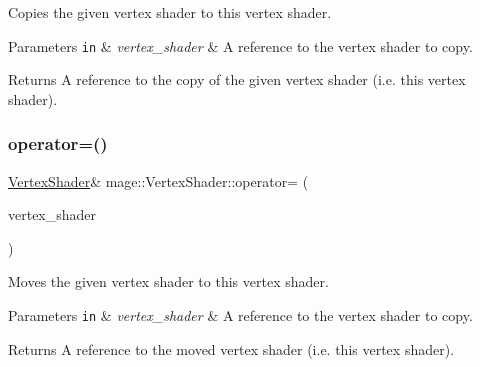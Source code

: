 Copies the given vertex shader to this vertex shader.


\begin{DoxyParams}[1]{Parameters}
\mbox{\tt in}  & {\em vertex\+\_\+shader} & A reference to the vertex shader to copy. \\
\hline
\end{DoxyParams}
\begin{DoxyReturn}{Returns}
A reference to the copy of the given vertex shader (i.\+e. this vertex shader). 
\end{DoxyReturn}
\hypertarget{classmage_1_1_vertex_shader_ada6250a89610e5649e0062c9a50fb78a}{}\label{classmage_1_1_vertex_shader_ada6250a89610e5649e0062c9a50fb78a} 
\subsubsection{\texorpdfstring{operator=()}{operator=()}\hspace{0.1cm}{\footnotesize\ttfamily [2/2]}}
{\footnotesize\ttfamily \hyperlink{classmage_1_1_vertex_shader}{Vertex\+Shader}\& mage\+::\+Vertex\+Shader\+::operator= (\begin{DoxyParamCaption}\item[{\hyperlink{classmage_1_1_vertex_shader}{Vertex\+Shader} \&\&}]{vertex\+\_\+shader }\end{DoxyParamCaption})\hspace{0.3cm}{\ttfamily [delete]}}

Moves the given vertex shader to this vertex shader.


\begin{DoxyParams}[1]{Parameters}
\mbox{\tt in}  & {\em vertex\+\_\+shader} & A reference to the vertex shader to copy. \\
\hline
\end{DoxyParams}
\begin{DoxyReturn}{Returns}
A reference to the moved vertex shader (i.\+e. this vertex shader). 
\end{DoxyReturn}
\hypertarget{classmage_1_1_vertex_shader_aafa4042ef93aa13d1c2fb68c210aa3fe}{}\label{classmage_1_1_vertex_shader_aafa4042ef93aa13d1c2fb68c210aa3fe} 
